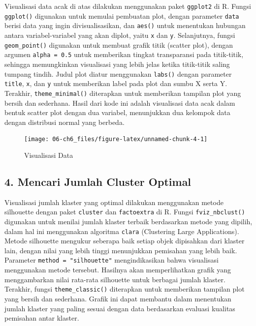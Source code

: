 \documentclass[
  oneside]{book}
\begin{document}
Visualisasi data acak di atas dilakukan menggunakan paket \texttt{ggplot2} di R. Fungsi \texttt{ggplot()} digunakan untuk memulai pembuatan plot, dengan parameter \texttt{data} berisi data yang ingin divisualisasikan, dan \texttt{aes()} untuk menentukan hubungan antara variabel-variabel yang akan diplot, yaitu \texttt{x} dan \texttt{y}. Selanjutnya, fungsi \texttt{geom\_point()} digunakan untuk membuat grafik titik (scatter plot), dengan argumen \texttt{alpha\ =\ 0.5} untuk memberikan tingkat transparansi pada titik-titik, sehingga memungkinkan visualisasi yang lebih jelas ketika titik-titik saling tumpang tindih. Judul plot diatur menggunakan \texttt{labs()} dengan parameter \texttt{title}, \texttt{x}, dan \texttt{y} untuk memberikan label pada plot dan sumbu X serta Y. Terakhir, \texttt{theme\_minimal()} diterapkan untuk memberikan tampilan plot yang bersih dan sederhana. Hasil dari kode ini adalah visualisasi data acak dalam bentuk scatter plot dengan dua variabel, menunjukkan dua kelompok data dengan distribusi normal yang berbeda.

\begin{figure}[h]

{\centering \texttt{[image: 06-ch6\_files/figure-latex/unnamed-chunk-4-1]} 

}

\caption{Visualisasi Data}\label{fig:unnamed-chunk-4}
\end{figure}

\subsection*{4. Mencari Jumlah Cluster Optimal}\label{mencari-jumlah-cluster-optimal}

Visualisasi jumlah klaster yang optimal dilakukan menggunakan metode silhouette dengan paket \texttt{cluster} dan \texttt{factoextra} di R. Fungsi \texttt{fviz\_nbclust()} digunakan untuk menilai jumlah klaster terbaik berdasarkan metode yang dipilih, dalam hal ini menggunakan algoritma \texttt{clara} (Clustering Large Applications). Metode silhouette mengukur seberapa baik setiap objek dipisahkan dari klaster lain, dengan nilai yang lebih tinggi menunjukkan pemisahan yang lebih baik. Parameter \texttt{method\ =\ "silhouette"} mengindikasikan bahwa visualisasi menggunakan metode tersebut. Hasilnya akan memperlihatkan grafik yang menggambarkan nilai rata-rata silhouette untuk berbagai jumlah klaster. Terakhir, fungsi \texttt{theme\_classic()} diterapkan untuk memberikan tampilan plot yang bersih dan sederhana. Grafik ini dapat membantu dalam menentukan jumlah klaster yang paling sesuai dengan data berdasarkan evaluasi kualitas pemisahan antar klaster.
\end{document}
